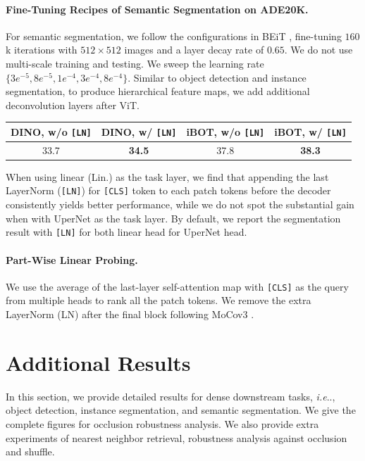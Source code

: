\documentclass{article} %
\makeatletter
\def\ourmethod{{iBOT}\xspace}
\DeclareRobustCommand\onedot{\futurelet\@let@token\@onedot}
\def\@onedot{\ifx\@let@token.\else.\null\fi\xspace}
\def\ie{\emph{i.e}\onedot} \def\Ie{\emph{I.e}\onedot}
\makeatother
\begin{document}
\paragraph{Fine-Tuning Recipes of Semantic Segmentation on ADE20K.} 
For semantic segmentation, we follow the configurations in BEiT \citep{beit}, fine-tuning $160$k iterations with $512\times512$ images and a layer decay rate of $0.65$. 
We do not use multi-scale training and testing. 
We sweep the learning rate $\{3e^{-5}, 8e^{-5}, 1e^{-4}, 3e^{-4}, 8e^{-4}\}$.
Similar to object detection and instance segmentation, to produce hierarchical feature maps, we add additional deconvolution layers after ViT.
\vspace{-0.3cm}
\begin{table}[H]
\centering
\begin{tabular}{cccc}
DINO, w/o \texttt{[LN]} & DINO, w/ \texttt{[LN]} & \ourmethod, w/o \texttt{[LN]} & \ourmethod, w/ \texttt{[LN]} \\
\toprule
33.7 & \bf 34.5  & 37.8 & \bf 38.3 \\
\end{tabular}
\end{table}
\vspace{-0.7cm}
When using linear (Lin.)  as the task layer, we find that appending the last LayerNorm (\texttt{[LN]}) for \texttt{[CLS]} token to each patch tokens before the decoder consistently yields better performance, while we do not spot the substantial gain when with UperNet as the task layer.
By default, we report the segmentation result with \texttt{[LN]} for both linear head for UperNet head.

\paragraph{Part-Wise Linear Probing.} We use the average of the last-layer self-attention map with \texttt{[CLS]} as the query from multiple heads to rank all the patch tokens. We remove the extra LayerNorm (LN) after the final block following MoCov3 \citep{mocov3}. 

\section{Additional Results}
\label{sec:addresult}

In this section, we provide detailed results for dense downstream tasks, \ie, object detection, instance segmentation, and semantic segmentation. We give the complete figures for occlusion robustness analysis. We also provide extra experiments of nearest neighbor retrieval, robustness analysis against occlusion and shuffle.
\end{document}
